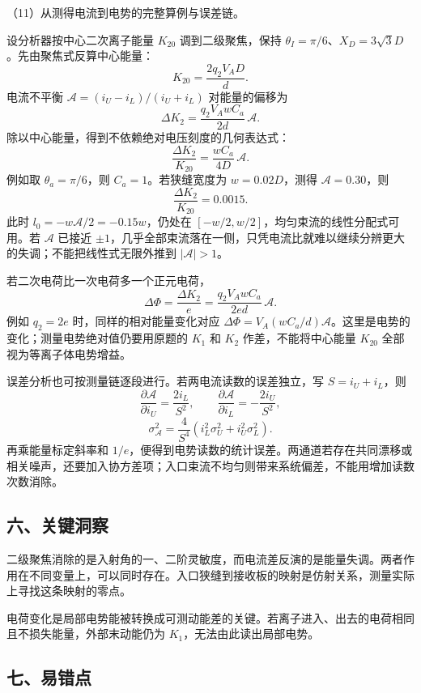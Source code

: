 \documentclass[12pt,a4paper,fontset=fandol]{ctexart}
\begin{document}
（11）从测得电流到电势的完整算例与误差链。

设分析器按中心二次离子能量 \(K_{20}\) 调到二级聚焦，保持
\(\theta_I=\pi/6\)、\(X_D=3\sqrt3D\)。先由聚焦式反算中心能量： \[
K_{20}=\frac{2q_2V_AD}{d}.
\] 电流不平衡 \(\mathcal A=(i_U-i_L)/(i_U+i_L)\) 对能量的偏移为 \[
\Delta K_2=\frac{q_2V_AwC_a}{2d}\,\mathcal A.
\] 除以中心能量，得到不依赖绝对电压刻度的几何表达式： \[
\boxed{\frac{\Delta K_2}{K_{20}}
=\frac{wC_a}{4D}\,\mathcal A.}
\] 例如取 \(\theta_a=\pi/6\)，则 \(C_a=1\)。若狭缝宽度为
\(w=0.02D\)，测得 \(\mathcal A=0.30\)，则 \[
\frac{\Delta K_2}{K_{20}}=0.0015.
\] 此时 \(l_0=-w\mathcal A/2=-0.15w\)，仍处在
\([-w/2,w/2]\)，均匀束流的线性分配式可用。若 \(\mathcal A\) 已接近
\(\pm1\)，几乎全部束流落在一侧，只凭电流比就难以继续分辨更大的失调；不能把线性式无限外推到
\(|\mathcal A|>1\)。

若二次电荷比一次电荷多一个正元电荷， \[
\Delta\Phi=\frac{\Delta K_2}{e}
=\frac{q_2V_AwC_a}{2ed}\,\mathcal A.
\] 例如 \(q_2=2e\) 时，同样的相对能量变化对应
\(\Delta\Phi=V_A(wC_a/d)\mathcal A\)。这里是电势的变化；测量电势绝对值仍要用原题的
\(K_1\) 和 \(K_2\) 作差，不能将中心能量 \(K_{20}\)
全部视为等离子体电势增益。

误差分析也可按测量链逐段进行。若两电流读数的误差独立，写
\(S=i_U+i_L\)，则 \[
\frac{\partial\mathcal A}{\partial i_U}=\frac{2i_L}{S^2},\qquad
\frac{\partial\mathcal A}{\partial i_L}=-\frac{2i_U}{S^2},
\] \[
\sigma_{\mathcal A}^2
=\frac{4}{S^4}\left(i_L^2\sigma_U^2+i_U^2\sigma_L^2\right).
\] 再乘能量标定斜率和
\(1/e\)，便得到电势读数的统计误差。两通道若存在共同漂移或相关噪声，还要加入协方差项；入口束流不均匀则带来系统偏差，不能用增加读数次数消除。

\subsection{六、关键洞察}\label{ux516dux5173ux952eux6d1eux5bdf-1}

二级聚焦消除的是入射角的一、二阶灵敏度，而电流差反演的是能量失调。两者作用在不同变量上，可以同时存在。入口狭缝到接收板的映射是仿射关系，测量实际上寻找这条映射的零点。

电荷变化是局部电势能被转换成可测动能差的关键。若离子进入、出去的电荷相同且不损失能量，外部末动能仍为
\(K_1\)，无法由此读出局部电势。

\subsection{七、易错点}\label{ux4e03ux6613ux9519ux70b9-1}
\end{document}
